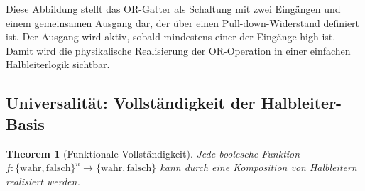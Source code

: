 \documentclass[12pt, a4paper]{article}
\newtheorem{theorem}{Theorem}[section]
\theoremstyle{definition}
\theoremstyle{remark}
\newcommand{\Bool}{\{\mathrm{wahr}, \mathrm{falsch}\}}
\begin{document}
Diese Abbildung stellt das OR-Gatter als Schaltung mit zwei Eingängen und einem gemeinsamen Ausgang dar, der über einen Pull-down-Widerstand definiert ist. Der Ausgang wird aktiv, sobald mindestens einer der Eingänge high ist. Damit wird die physikalische Realisierung der OR-Operation in einer einfachen Halbleiterlogik sichtbar.

 
 
 
 
 

\subsection{Universalität: Vollständigkeit der Halbleiter-Basis}
\label{subsec:universalitaet}

\begin{theorem}[Funktionale Vollständigkeit]
\label{thm:funktionale_vollstaendigkeit}
Jede boolesche Funktion $f: \Bool^n \to \Bool$ kann durch eine Komposition von Halbleitern realisiert werden.
\end{theorem}
\end{document}
